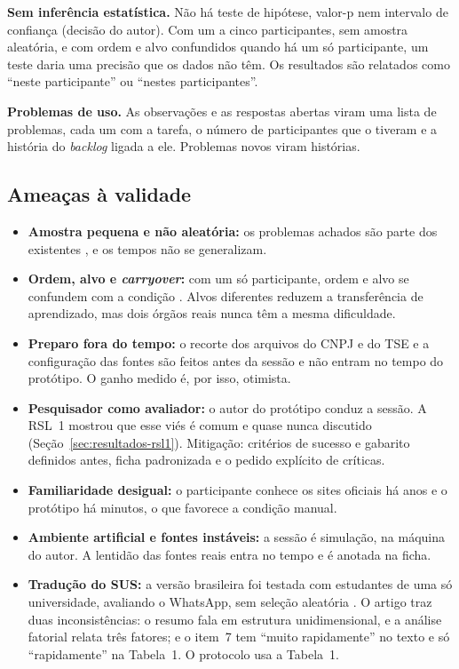 \textbf{Sem inferência estatística.} Não há teste de hipótese, valor-p nem
intervalo de confiança (decisão do autor). Com um a cinco participantes, sem
amostra aleatória, e com ordem e alvo confundidos quando há um só
participante, um teste daria uma precisão que os dados não têm. Os
resultados são relatados como ``neste participante'' ou ``nestes
participantes''.

\textbf{Problemas de uso.} As observações e as respostas abertas viram uma
lista de problemas, cada um com a tarefa, o número de participantes que o
tiveram e a história do \textit{backlog} ligada a ele. Problemas novos viram
histórias.

\subsection{Ameaças à validade}
\label{sec:avaliacao-ameacas}

\begin{itemize}
	\item \textbf{Amostra pequena e não aleatória:} os problemas achados são
	parte dos existentes \cite{faulkner2003}, e os tempos não se
	generalizam.
	\item \textbf{Ordem, alvo e \textit{carryover}:} com um só participante,
	ordem e alvo se confundem com a condição \cite{vegas2016crossover}. Alvos
	diferentes reduzem a transferência de aprendizado, mas dois órgãos reais
	nunca têm a mesma dificuldade.
	\item \textbf{Preparo fora do tempo:} o recorte dos arquivos do CNPJ e
	do TSE e a configuração das fontes são feitos antes da sessão e não
	entram no tempo do protótipo. O ganho medido é, por isso, otimista.
	\item \textbf{Pesquisador como avaliador:} o autor do protótipo conduz a
	sessão. A RSL~1 mostrou que esse viés é comum e quase nunca discutido
	(Seção~\ref{sec:resultados-rsl1}). Mitigação: critérios de sucesso e
	gabarito definidos antes, ficha padronizada e o pedido explícito de
	críticas.
	\item \textbf{Familiaridade desigual:} o participante conhece os sites
	oficiais há anos e o protótipo há minutos, o que favorece a condição
	manual.
	\item \textbf{Ambiente artificial e fontes instáveis:} a sessão é
	simulação, na máquina do autor. A lentidão das fontes reais entra no
	tempo e é anotada na ficha.
	\item \textbf{Tradução do SUS:} a versão brasileira foi testada com
	estudantes de uma só universidade, avaliando o WhatsApp, sem seleção
	aleatória \cite{lourenco2022sus}. O artigo traz duas inconsistências: o
	resumo fala em estrutura unidimensional, e a análise fatorial relata três
	fatores; e o item~7 tem ``muito rapidamente'' no texto e só
	``rapidamente'' na Tabela~1. O protocolo usa a Tabela~1.
\end{itemize}

